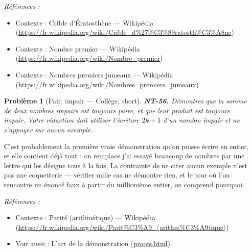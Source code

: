 \documentclass[11pt]{article}
\newtheorem{problem}{Problème}
\newenvironment{refs}{\par\small\noindent\emph{Références :}\begin{itemize}\setlength\itemsep{0pt}}{\end{itemize}\normalsize}
\begin{document}
\begin{refs}
\item Contexte : Crible d'Ératosthène --- Wikipédia (\url{https://fr.wikipedia.org/wiki/Crible_d%27%C3%89ratosth%C3%A8ne})
\item Contexte : Nombre premier --- Wikipédia (\url{https://fr.wikipedia.org/wiki/Nombre_premier})
\item Contexte : Nombres premiers jumeaux --- Wikipédia (\url{https://fr.wikipedia.org/wiki/Nombres_premiers_jumeaux})
\end{refs}

\bigskip

\begin{problem}[{Pair, impair --- Collège, short}]
\textbf{NT-56.} Démontrez que la somme de deux nombres impairs est toujours
paire, et que leur produit est toujours impair. Votre rédaction doit utiliser l'écriture
$ 2k + 1 $ d'un nombre impair et ne s'appuyer sur aucun exemple.
\end{problem}

\noindent C'est probablement la première vraie démonstration qu'on puisse écrire en entier,
et elle contient déjà tout : on remplace \og{} j'ai essayé beaucoup de nombres \fg{} par une lettre qui les
désigne tous à la fois. La contrainte de ne citer aucun exemple n'est pas une coquetterie --- vérifier
mille cas ne démontre rien, et le jour où l'on rencontre un énoncé faux à partir du millionième
entier, on comprend pourquoi.

\begin{refs}
\item Contexte : Parité (arithmétique) --- Wikipédia (\url{https://fr.wikipedia.org/wiki/Parit%C3%A9_(arithm%C3%A9tique)})
\item Voir aussi : L'art de la démonstration (\url{proofs.html})
\end{refs}

\bigskip
\end{document}
